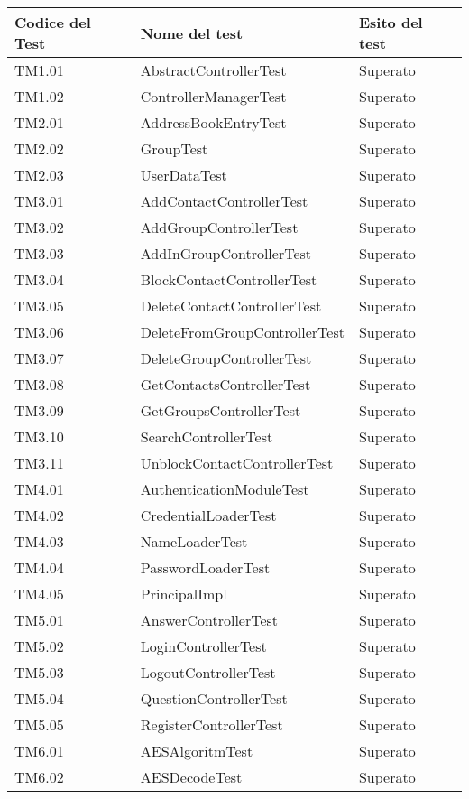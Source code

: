 \begin{center}
\begin{longtable}{p{}ll}
\toprule Codice del Test & Nome del test  & Esito del test\\
\midrule

TM1.01 & AbstractControllerTest &Superato\\
TM1.02 & ControllerManagerTest &Superato\\
TM2.01 & AddressBookEntryTest &Superato\\
TM2.02 & GroupTest &Superato\\
TM2.03 & UserDataTest &Superato\\
TM3.01 & AddContactControllerTest &Superato\\
TM3.02 & AddGroupControllerTest &Superato\\
TM3.03 & AddInGroupControllerTest &Superato\\
TM3.04 & BlockContactControllerTest &Superato\\
TM3.05 & DeleteContactControllerTest &Superato\\
TM3.06 & DeleteFromGroupControllerTest &Superato\\
TM3.07 & DeleteGroupControllerTest &Superato\\
TM3.08 & GetContactsControllerTest &Superato\\
TM3.09 & GetGroupsControllerTest &Superato\\
TM3.10 & SearchControllerTest &Superato\\
TM3.11 & UnblockContactControllerTest &Superato\\
TM4.01 & AuthenticationModuleTest &Superato\\
TM4.02 & CredentialLoaderTest &Superato\\
TM4.03 & NameLoaderTest &Superato\\
TM4.04 & PasswordLoaderTest &Superato\\
TM4.05 & PrincipalImpl &Superato\\
TM5.01 & AnswerControllerTest &Superato\\
TM5.02 & LoginControllerTest &Superato\\
TM5.03 & LogoutControllerTest &Superato\\
TM5.04 & QuestionControllerTest &Superato\\
TM5.05 & RegisterControllerTest &Superato\\
TM6.01 & AESAlgoritmTest &Superato\\
TM6.02 & AESDecodeTest &Superato\\

\end{longtable}
\end{center}
